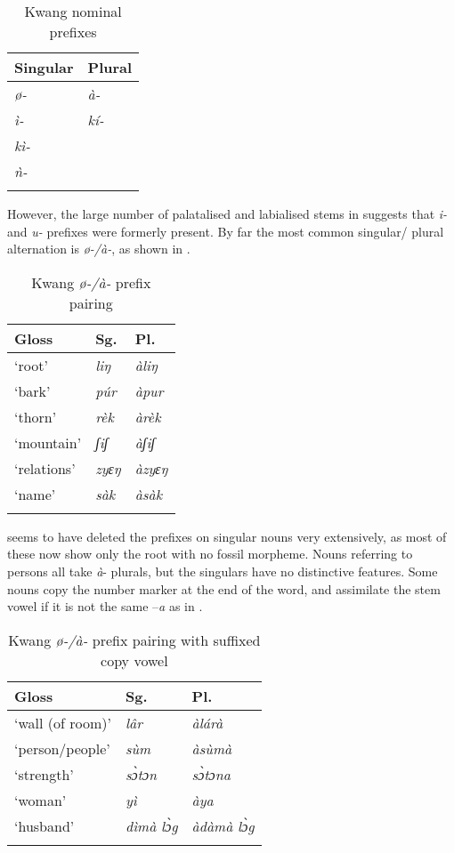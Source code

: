 \documentclass[output=paper]{langsci/langscibook}
\begin{document}
\begin{table}
\caption{\label{tab:nomaffplat:21} Kwang nominal prefixes}
\begin{tabularx}{\textwidth}{XX}
\lsptoprule
  Singular 	&   Plural\\
\midrule
\itshape ø- 	& \itshape   à-\\
\itshape ì- 	& \itshape   kí-\\
\itshape kì- 	& \\
\itshape ǹ- 	& \\
\lspbottomrule
\end{tabularx}
\end{table}


However, the large number of palatalised and labialised stems in  suggests that \textit{i-} and \textit{u-} prefixes were formerly present. By far the most common singular/ plural alternation is \textit{ø-/à-}, as shown in .

\begin{table}
\caption{Kwang \textit{ø-/à-} prefix pairing}
\label{extab:nomaffplat:57}
\begin{tabularx}{\textwidth}{XXX}
 \lsptoprule
Gloss 	& Sg.  	& Pl. \\
\midrule
 {‘}root’ 	& \itshape   liŋ 	& \itshape   àliŋ\\
‘bark’ 	& \itshape   púr 	& \itshape   àpur\\
‘thorn’ 	& \itshape   rèk 	& \itshape   àrèk\\
‘mountain’ 	& \itshape   ʃiʃ 	& \itshape   àʃiʃ\\
‘relations’ 	& \itshape   zyɛŋ 	& \itshape   àzyɛŋ\\
‘name’ 	& \itshape   sàk 	& \itshape   àsàk\\
 \lspbottomrule
\end{tabularx}
\end{table}


 seems to have deleted the prefixes on singular nouns very extensively, as most of these now show only the root with no fossil morpheme. Nouns referring to persons all take \textit{à}- plurals, but the singulars have no distinctive features. Some nouns copy the number marker at the end of the word, and assimilate the stem vowel if it is not the same –\textit{a} as in .

\begin{table}
\caption{Kwang \textit{ø-/à-} prefix pairing with suffixed copy vowel}
\label{extab:nomaffplat:58}
\begin{tabularx}{.75\textwidth}{XXl} 
\lsptoprule
Gloss 	& Sg.  	& Pl. \\
\midrule
‘wall (of room)’ 	& \itshape lâr 	& \itshape àlárà\\
‘person/people’ 	& \itshape sùm 	& \itshape àsùmà\\
‘strength’ 	& \itshape sɔ̀tɔn 	& \itshape sɔ̀tɔna\\
‘woman’ 	& \itshape yì 	& \itshape àya\\
‘husband’ 	& \itshape dìmà lɔ̀g 	& \itshape àdàmà lɔ̀g\\
 \lspbottomrule
\end{tabularx} 
\end{table}
\end{document}
